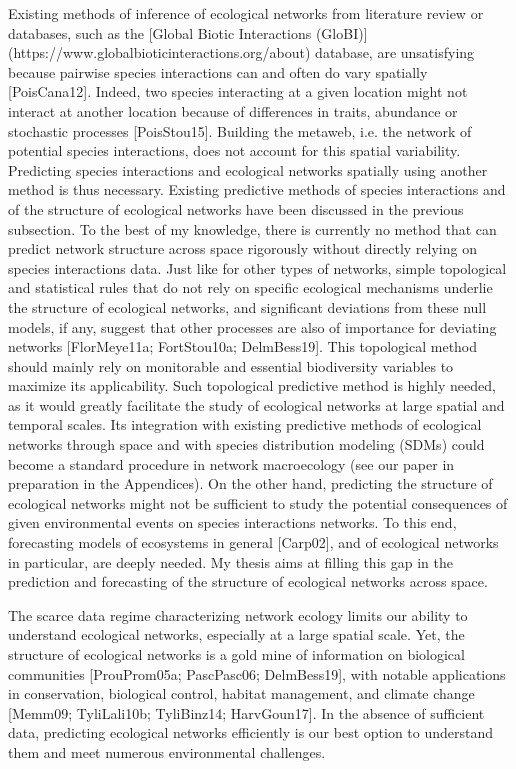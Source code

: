 Existing methods of inference of ecological networks from literature review or
databases, such as the [Global Biotic Interactions
(GloBI)](https://www.globalbioticinteractions.org/about) database, are
unsatisfying because pairwise species interactions can and often do vary
spatially [PoisCana12]. Indeed, two species interacting at a given location
might not interact at another location because of differences in traits,
abundance or stochastic processes [PoisStou15]. Building the metaweb, i.e. the
network of potential species interactions, does not account for this spatial
variability. Predicting species interactions and ecological networks spatially
using another method is thus necessary. Existing predictive methods of species
interactions and of the structure of ecological networks have been discussed in
the previous subsection. To the best of my knowledge, there is currently no
method that can predict network structure across space rigorously without
directly relying on species interactions data. Just like for other types of
networks, simple topological and statistical rules that do not rely on specific
ecological mechanisms underlie the structure of ecological networks, and
significant deviations from these null models, if any, suggest that other
processes are also of importance for deviating networks [FlorMeye11a;
FortStou10a; DelmBess19]. This topological method should mainly rely on
monitorable and essential biodiversity variables to maximize its applicability.
Such topological predictive method is highly needed, as it would greatly
facilitate the study of ecological networks at large spatial and temporal
scales. Its integration with existing predictive methods of ecological networks
through space and with species distribution modeling (SDMs) could become a
standard procedure in network macroecology (see our paper in preparation in the
Appendices). On the other hand, predicting the structure of ecological networks
might not be sufficient to study the potential consequences of given
environmental events on species interactions networks. To this end, forecasting
models of ecosystems in general [Carp02], and of ecological networks in
particular, are deeply needed. My thesis aims at filling this gap in the prediction and forecasting of the
structure of ecological networks across space. 

The scarce data regime characterizing network ecology limits our ability to
understand ecological networks, especially at a large spatial scale. Yet, the
structure of ecological networks is a gold mine of information on biological
communities [ProuProm05a; PascPasc06; DelmBess19], with notable applications
in conservation, biological control, habitat management, and climate change
[Memm09; TyliLali10b; TyliBinz14; HarvGoun17]. In the absence of sufficient
data, predicting ecological networks efficiently is our best option to
understand them and meet numerous environmental challenges.

